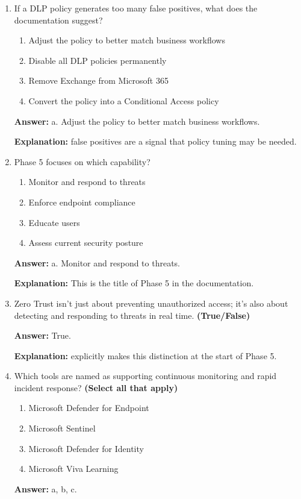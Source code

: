 \documentclass[10pt]{article}
\begin{document}
\begin{enumerate}[leftmargin=*]
\textbf{Explanation:} these as the core elements of effective data protection and continuous improvement.

\item If a DLP policy generates too many false positives, what does the documentation suggest?
\begin{enumerate}[label=\alph*., leftmargin=1.5em]
\item Adjust the policy to better match business workflows
\item Disable all DLP policies permanently
\item Remove Exchange from Microsoft 365
\item Convert the policy into a Conditional Access policy
\end{enumerate}
\textbf{Answer:} a. Adjust the policy to better match business workflows.

\textbf{Explanation:} false positives are a signal that policy tuning may be needed.

\item Phase 5 focuses on which capability?
\begin{enumerate}[label=\alph*., leftmargin=1.5em]
\item Monitor and respond to threats
\item Enforce endpoint compliance
\item Educate users
\item Assess current security posture
\end{enumerate}
\textbf{Answer:} a. Monitor and respond to threats.

\textbf{Explanation:} This is the title of Phase 5 in the documentation.

\item Zero Trust isn’t just about preventing unauthorized access; it’s also about detecting and responding to threats in real time. \textbf{(True/False)}

\textbf{Answer:} True.

\textbf{Explanation:} explicitly makes this distinction at the start of Phase 5.

\item Which tools are named as supporting continuous monitoring and rapid incident response? \textbf{(Select all that apply)}
\begin{enumerate}[label=\alph*., leftmargin=1.5em]
\item Microsoft Defender for Endpoint
\item Microsoft Sentinel
\item Microsoft Defender for Identity
\item Microsoft Viva Learning
\end{enumerate}
\textbf{Answer:} a, b, c.


\end{enumerate}
\end{document}
